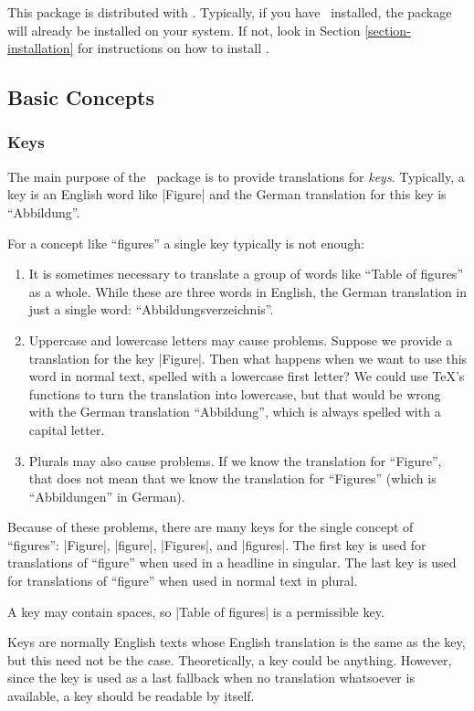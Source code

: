 This package is distributed with \beamer. Typically, if you have \beamer\ installed, the package will already be installed on your system. If not, look in Section \ref{section-installation} for instructions on how to install \beamer.


\subsection{Basic Concepts}

\subsubsection{Keys}

The main purpose of the \translatorname\ package is to provide translations for \emph{keys}. Typically, a key is an English word like |Figure| and the German translation for this key is ``Abbildung''.

For a concept like ``figures'' a single key typically is not enough:
\begin{enumerate}
  \item  It is sometimes necessary to translate a group of words like ``Table of figures'' as a whole. While these are three words in English, the German translation in just a single word: ``Abbildungsverzeichnis''.
  \item Uppercase and lowercase letters may cause problems. Suppose we provide a translation for the key |Figure|. Then what happens when we want to use this word in normal text, spelled with a lowercase first letter? We could use \TeX's functions to turn the translation into lowercase, but that would be wrong with the German translation ``Abbildung'', which is always spelled with a capital letter.
  \item  Plurals may also cause problems. If we know the translation for ``Figure'', that does not mean that we know the translation for ``Figures'' (which is ``Abbildungen'' in German).
\end{enumerate}

Because of these problems, there are many keys for the single concept of ``figures'': |Figure|, |figure|, |Figures|, and |figures|. The first key is used for translations of  ``figure'' when used in a headline in singular. The last key is used for translations of ``figure'' when used in normal text in plural.

A key may contain spaces, so |Table of figures| is a permissible key.

Keys are normally English texts whose English translation is the same as the key, but this need not be the case. Theoretically, a key could be anything. However, since the key is used as a last fallback when no translation whatsoever is available, a key should be readable by itself.

